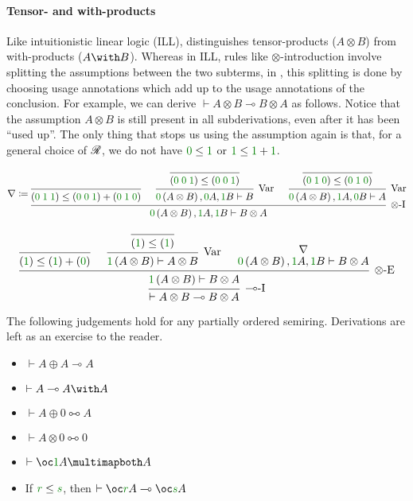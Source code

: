 \paragraph{Tensor- and with-products}
Like intuitionistic linear logic (ILL), \name{} distinguishes tensor-products
($A \otimes B$) from with-products ($A \with B$).
Whereas in ILL, rules like $\otimes$-introduction involve splitting the
assumptions between the two subterms, in \name{}, this splitting is done by
choosing usage annotations which add up to the usage annotations of the
conclusion.
For example, we can derive $\vdash A \otimes B \multimap B \otimes A$ as
follows.
Notice that the assumption $A \otimes B$ is still present in all subderivations,
even after it has been ``used up''.
The only thing that stops us using the assumption again is that, for a general
choice of $\mathscr R$, we do not have $\gr0 \leq \gr1$ or $\gr1 \leq \gr1 + \gr1$.

\begin{small}
  \[
    \nabla \coloneqq
    \begin{prooftree}
      \infer0{\plr{\gr0\;\gr1\;\gr1} \leq
        \plr{\gr0\;\gr0\;\gr1} + \plr{\gr0\;\gr1\;\gr0}}
      \infer0{\plr{\gr0\;\gr0\;\gr1} \leq \plr{\gr0\;\gr0\;\gr1}}
      \infer1[Var]{\gr0\plr{A \otimes B}, \gr0A, \gr1B \vdash B}
      \infer0{\plr{\gr0\;\gr1\;\gr0} \leq \plr{\gr0\;\gr1\;\gr0}}
      \infer1[Var]{\gr0\plr{A \otimes B}, \gr1A, \gr0B \vdash A}
      \infer3[$\otimes$-I]%
      {\gr0\plr{A \otimes B}, \gr1A, \gr1B \vdash B \otimes A}
    \end{prooftree}
  \]

  \[
    \begin{prooftree}
      \infer0{\plr{\gr1} \leq \plr{\gr1} + \plr{\gr0}}
      \infer0{\plr{\gr1} \leq \plr{\gr1}}
      \infer1[Var]{\gr1\plr{A \otimes B} \vdash A \otimes B}
      \hypo{\nabla}
      \infer[no rule]1{\gr0\plr{A \otimes B}, \gr1A, \gr1B \vdash B \otimes A}
      \infer3[$\otimes$-E]{\gr1\plr{A \otimes B} \vdash B \otimes A}
      \infer1[$\multimap$-I]{\vdash A \otimes B \multimap B \otimes A}
    \end{prooftree}
  \]
\end{small}

\begin{example}
  The following judgements hold for any partially ordered semiring.
  Derivations are left as an exercise to the reader.
  \begin{itemize}
    \item $\vdash A \oplus A \multimap A$
    \item $\vdash A \multimap A \with A$
    \item $\vdash A \oplus 0 \multimapboth A$
    \item $\vdash A \otimes 0 \multimapboth 0$
    \item $\vdash \oc\gr1A \multimapboth A$
    \item If $\gr r \leq \gr s$, then $\vdash \oc\gr rA \multimap \oc\gr sA$
  \end{itemize}
\end{example}


